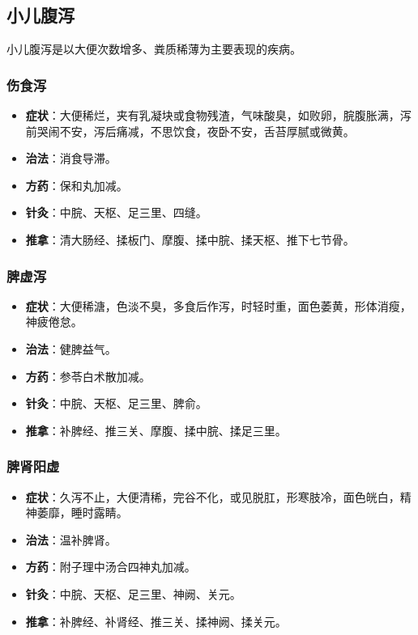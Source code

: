 \documentclass[12pt,UTF8]{ctexbook}
\begin{document}
\subsection{小儿腹泻}

小儿腹泻是以大便次数增多、粪质稀薄为主要表现的疾病。

\subsubsection{伤食泻}

\begin{itemize}
\item \textbf{症状}：大便稀烂，夹有乳凝块或食物残渣，气味酸臭，如败卵，脘腹胀满，泻前哭闹不安，泻后痛减，不思饮食，夜卧不安，舌苔厚腻或微黄。
\item \textbf{治法}：消食导滞。
\item \textbf{方药}：保和丸加减。
\item \textbf{针灸}：中脘、天枢、足三里、四缝。
\item \textbf{推拿}：清大肠经、揉板门、摩腹、揉中脘、揉天枢、推下七节骨。
\end{itemize}

\subsubsection{脾虚泻}

\begin{itemize}
\item \textbf{症状}：大便稀溏，色淡不臭，多食后作泻，时轻时重，面色萎黄，形体消瘦，神疲倦怠。
\item \textbf{治法}：健脾益气。
\item \textbf{方药}：参苓白术散加减。
\item \textbf{针灸}：中脘、天枢、足三里、脾俞。
\item \textbf{推拿}：补脾经、推三关、摩腹、揉中脘、揉足三里。
\end{itemize}

\subsubsection{脾肾阳虚}

\begin{itemize}
\item \textbf{症状}：久泻不止，大便清稀，完谷不化，或见脱肛，形寒肢冷，面色㿠白，精神萎靡，睡时露睛。
\item \textbf{治法}：温补脾肾。
\item \textbf{方药}：附子理中汤合四神丸加减。
\item \textbf{针灸}：中脘、天枢、足三里、神阙、关元。
\item \textbf{推拿}：补脾经、补肾经、推三关、揉神阙、揉关元。
\end{itemize}
\end{document}
